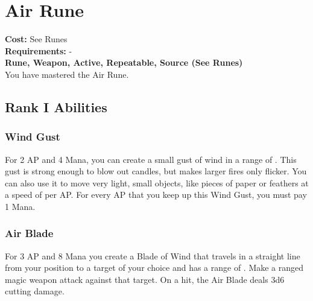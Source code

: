 \section{Air Rune}\label{rune:air}
\textbf{Cost:} See Runes\\
\textbf{Requirements:} -\\
\textbf{Rune, Weapon, Active, Repeatable, Source (See Runes)}\\
You have mastered the Air Rune.

\subsection{Rank I Abilities}

\subsubsection{Wind Gust}
For 2 AP and 4 Mana, you can create a small gust of wind in a range of .
This gust is strong enough to blow out candles, but makes larger fires only flicker.
You can also use it to move very light, small objects, like pieces of paper or feathers at a speed of  per AP.
For every AP that you keep up this Wind Gust, you must pay 1 Mana.

\subsubsection{Air Blade}
For 3 AP and 8 Mana you create a Blade of Wind that travels in a straight line from your position to a target of your choice and has a range of .
Make a ranged magic weapon attack against that target.
On a hit, the Air Blade deals 3d6 cutting damage.